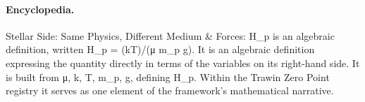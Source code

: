 \paragraph{Encyclopedia.}
Stellar Side: Same Physics, Different Medium \& Forces: H\_p is an algebraic definition, written H\_p = (kT)/(μ m\_p g). It is an algebraic definition expressing the quantity directly in terms of the variables on its right-hand side. It is built from μ, k, T, m\_p, g, defining H\_p. Within the Trawin Zero Point registry it serves as one element of the framework's mathematical narrative.
